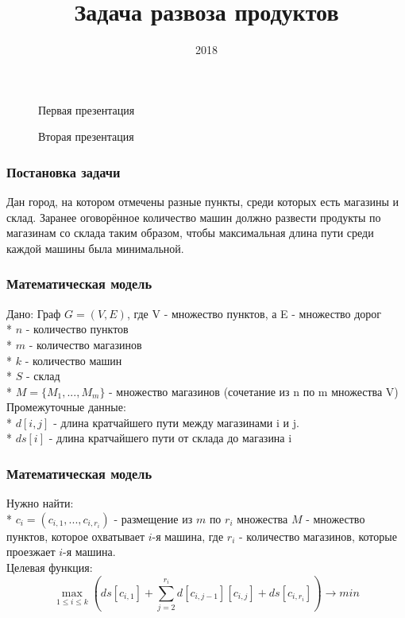 \documentclass{beamer}
\title{Задача развоза продуктов}
\date{2018}
\begin{document}
\frame{\titlepage}
\begin{frame}
    \begin{figure}
        \centering
        Первая презентация
    \end{figure}
\end{frame}

\begin{frame}
    \begin{figure}
        Вторая презентация
    \end{figure}
\end{frame}

\begin{frame}
    \frametitle{Постановка задачи}
    Дан город, на котором отмечены разные пункты, среди которых есть магазины и склад.
    Заранее оговорённое количество машин должно развести продукты по магазинам со склада
    таким образом, чтобы максимальная длина пути среди каждой машины была минимальной.
\end{frame}
\begin{frame}
    \frametitle{Математическая модель}
    Дано:
    Граф \( G = (V, E) \), где V - множество пунктов, а E - 
    множество дорог\\*
    \(n\) - количество пунктов\\*
    \(m\) - количество магазинов\\*
    \(k\) - количество машин\\*
    \(S\) - склад\\*
    \(M = \{M_1, ..., M_m\}\) - множество магазинов (сочетание из n 
    по m множества V)\\
    Промежуточные данные:\\*
    \(d[i, j]\) - длина кратчайшего пути между магазинами i и j.\\*
    \(ds[i]\) - длина кратчайшего пути от склада до магазина i
\end{frame}
\begin{frame}
    \frametitle{Математическая модель}
    Нужно найти:\\*
    \(c_i = (c_{i,1}, ..., c_{i,r_i})\) - размещение 
    из \(m\) по \(r_i\) множества \(M\) - множество пунктов,
    которое охватывает \(i\)-я машина, где \(r_i\) - количество магазинов, которые проезжает \(i\)-я машина.\\
    Целевая функция:
    \[\max_{1 \leq i \leq k} \left(ds[c_{i,1}] + \sum\limits_{j = 2}^{r_i}d[c_{i,j-1}][c_{i,j}] + ds[c_{i,r_i}]\right) \longrightarrow min \]
\end{frame}
\end{document}
